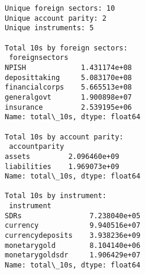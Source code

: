 \documentclass[11pt]{article}
\begin{document}
    \begin{Verbatim}[commandchars=\\\{\}]
Unique foreign sectors: 10
Unique account parity: 2
Unique instruments: 5

Total 10s by foreign sectors:
 foreignsectors
NPISH             1.431174e+08
deposittaking     5.083170e+08
financialcorps    5.665513e+08
generalgovt       1.900898e+07
insurance         2.539195e+06
Name: total\_10s, dtype: float64

Total 10s by account parity:
 accountparity
assets         2.096460e+09
liabilities    1.969073e+09
Name: total\_10s, dtype: float64

Total 10s by instrument:
 instrument
SDRs                7.238040e+05
currency            9.940516e+07
currencydeposits    3.938236e+09
monetarygold        8.104140e+06
monetarygoldsdr     1.906429e+07
Name: total\_10s, dtype: float64
    \end{Verbatim}
\end{document}
